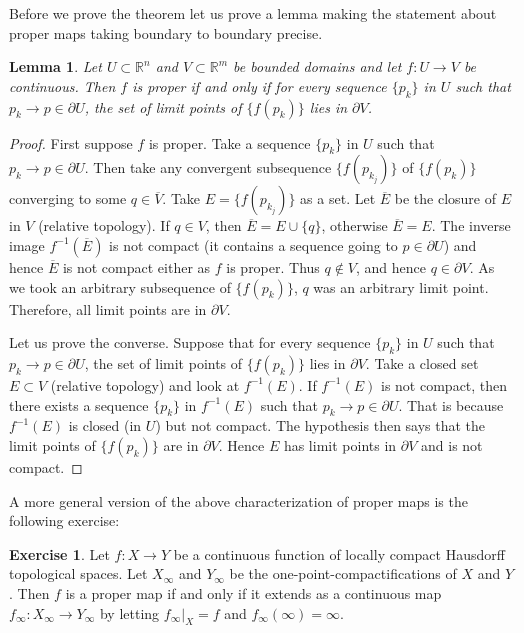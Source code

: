 \documentclass[12pt,openany]{book}
\newcommand{\R}{{\mathbb{R}}}
\theoremstyle{plain}
\newtheorem{lemma}[thm]{Lemma}
\theoremstyle{remark}
\theoremstyle{definition}
\newenvironment{exbox}{%
    \def\FrameCommand{\vrule width 1pt \relax\hspace {10pt}}%
    \MakeFramed {\advance \hsize -\width \FrameRestore }%
}{%
    \endMakeFramed
}
\theoremstyle{exercise}
\newtheorem{exercise}{Exercise}[section]
\theoremstyle{example}
\begin{document}
Before we prove the theorem let us prove a lemma making the statement about
proper maps taking boundary to boundary precise.

\begin{lemma} \label{lemma:bndrytobndry}
Let $U \subset \R^n$ and $V \subset \R^m$ be bounded domains and
let $f \colon U \to V$ be continuous.
Then $f$ is proper if and only if
for every sequence $\{ p_k \}$ in $U$ such that $p_k \to p \in \partial U$,
the set of limit points of $\{ f(p_k) \}$ lies in $\partial V$.
\end{lemma}

\begin{proof}
First suppose $f$ is proper.  Take a 
sequence $\{ p_k \}$ in $U$ such that $p_k \to p \in \partial U$.
Then take any convergent subsequence $\{ f(p_{k_j}) \}$ of $\{ f(p_k) \}$
converging to some $q \in \overline{V}$.  Take
$E = \{ f(p_{k_j}) \}$ as a set.  Let $\overline{E}$ be the closure of $E$
in $V$ (relative topology).  If $q \in V$, then $\overline{E} = E \cup \{ q \}$, otherwise
$\overline{E} = E$.
The inverse image $f^{-1}(\overline{E})$
is not compact (it contains a sequence going to $p \in \partial U$)
and hence $\overline{E}$ is not
compact either as $f$ is proper.  Thus $q \notin V$, and hence $q \in
\partial V$.  As we took an arbitrary subsequence of $\{ f(p_k) \}$, $q$ was
an arbitrary limit point.  Therefore, all limit points are in $\partial V$.

Let us prove the converse.
Suppose that for every sequence
$\{ p_k \}$ in $U$ such that $p_k \to p \in \partial U$,
the set of limit points of $\{ f(p_k) \}$ lies in $\partial V$.
Take a closed set $E \subset V$ (relative topology) and look at $f^{-1}(E)$.  If $f^{-1}(E)$
is not compact, then there exists a sequence $\{ p_k \}$ in $f^{-1}(E)$
such that $p_k \to p \in \partial U$.  That is because $f^{-1}(E)$ is closed
(in $U$) but not compact.  The hypothesis then says that the limit points of
$\{ f(p_k) \}$ are in $\partial V$.  Hence $E$ has limit points in
$\partial V$ and is not compact.
\end{proof}

A more general version of the above characterization of proper maps is the following exercise:

\begin{exbox}
\begin{exercise}
Let $f \colon X \to Y$ be a continuous function of locally compact Hausdorff topological spaces.
Let $X_\infty$ and $Y_\infty$ be the 
one-point-compactifications of $X$ and $Y$.
Then $f$ is a proper map if and only if it extends as a continuous map
$f_\infty \colon X_\infty \to Y_\infty$ by letting
$f_\infty |_X = f$ and
 $f_\infty(\infty) = \infty$.
\end{exercise}
\end{exbox}
\end{document}
